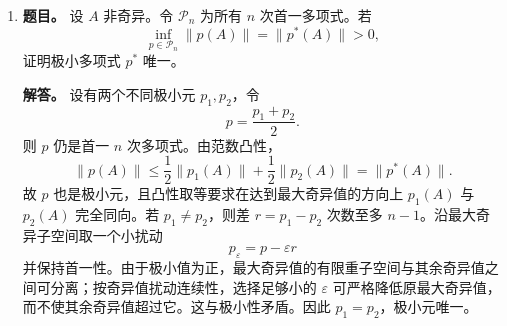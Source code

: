 ﻿\documentclass[UTF8,12pt]{ctexart}
\begin{document}
\begin{enumerate}[label=\textbf{\arabic*.},leftmargin=2.2em]
\item \textbf{题目。} 设 \(A\) 非奇异。令 \(\mathcal P_n\) 为所有 \(n\) 次首一多项式。若
\[
\inf_{p\in\mathcal P_n}\|p(A)\|=\|p^\ast(A)\|>0,
\]
证明极小多项式 \(p^\ast\) 唯一。

\textbf{解答。} 设有两个不同极小元 \(p_1,p_2\)，令
\[
p=\frac{p_1+p_2}{2}.
\]
则 \(p\) 仍是首一 \(n\) 次多项式。由范数凸性，
\[
\|p(A)\|\le\frac12\|p_1(A)\|+\frac12\|p_2(A)\|=\|p^\ast(A)\|.
\]
故 \(p\) 也是极小元，且凸性取等要求在达到最大奇异值的方向上 \(p_1(A)\) 与 \(p_2(A)\) 完全同向。若 \(p_1\ne p_2\)，则差 \(r=p_1-p_2\) 次数至多 \(n-1\)。沿最大奇异子空间取一个小扰动
\[
p_\varepsilon=p-\varepsilon r
\]
并保持首一性。由于极小值为正，最大奇异值的有限重子空间与其余奇异值之间可分离；按奇异值扰动连续性，选择足够小的 \(\varepsilon\) 可严格降低原最大奇异值，而不使其余奇异值超过它。这与极小性矛盾。因此 \(p_1=p_2\)，极小元唯一。
\end{enumerate}
\end{document}
